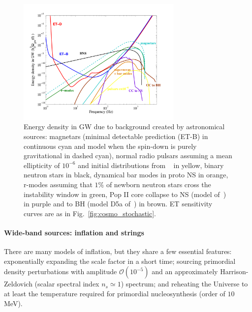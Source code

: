 \begin{figure}[p]
\vskip -0.4cm
\centering
\vskip -0.3cm
\hskip 0.55cm
\includegraphics[width=0.72\textwidth]{./Sec_ET_ScienceCase/landscape-agb.pdf}
\vskip -0.3cm
\caption{Energy density in GW due to background created by astronomical sources: magnetars (minimal detectable prediction (ET-B) in continuous cyan and model when the spin-down is purely gravitational in dashed cyan), normal radio pulsars assuming a mean ellipticity of $10^{-6}$ and initial distributions from ~\cite{2011arXiv1103.1856G} in yellow, binary neutron stars in black, dynamical bar modes in proto NS in orange, r-modes assuming that $1 \%$ of newborn neutron stars cross the instability window in green, Pop II core collapse to NS (model of~\cite{Ott:2006}) in purple and to BH (model D5a of~\cite{Sekiguchi:2005}) in brown. ET sensitivity curves are as in Fig.~\ref{fig:cosmo_stochastic}.
}
\label{fig:astro_stochastic}
\end{figure}
%

\paragraph{Wide-band sources: inflation and strings}


\noindent There are many models of inflation, but they share a few essential features: exponentially expanding the scale factor in a short time; sourcing primordial density perturbations with amplitude $\mathcal{O}(10^{-5})$ and an approximately Harrison-Zeldovich (scalar spectral index $n_s\simeq 1$) spectrum; and reheating the Universe to at least the temperature required for primordial nucleosynthesis (order of $10\,$MeV).

